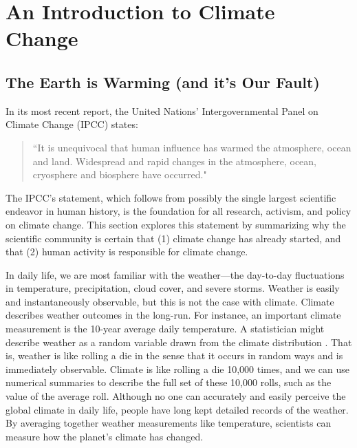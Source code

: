 \newpage
\section{An Introduction to Climate Change}

\subsection{The Earth is Warming (and it's Our Fault)}

In its most recent report, the United Nations' Intergovernmental Panel on Climate Change (IPCC) states:
\begin{quote}
	\singlespacing``It is unequivocal that human influence has warmed the atmosphere, ocean and land. Widespread and rapid changes in the atmosphere, ocean, cryosphere and biosphere have occurred." \citep{ipcc1_summary}
\end{quote}
The IPCC's statement, which follows from possibly the single largest scientific endeavor in human history, is the foundation for all research, activism, and policy on climate change. This section explores this statement by summarizing why the scientific community is certain that (1) climate change has already started, and that (2) human activity is responsible for climate change. 

In daily life, we are most familiar with the weather---the day-to-day fluctuations in temperature, precipitation, cloud cover, and severe storms. Weather is easily and instantaneously observable, but this is not the case with climate. Climate describes weather outcomes in the long-run. For instance, an important climate measurement is the 10-year average daily temperature. A statistician might describe weather as a random variable drawn from the climate distribution \citep{auffhammer2018quantifying}. That is, weather is like rolling a die in the sense that it occurs in random ways and is immediately observable. Climate is like rolling a die 10,000 times, and we can use numerical summaries to describe the full set of these 10,000 rolls, such as the value of the average roll. Although no one can accurately and easily perceive the global climate in daily life, people have long kept detailed records of the weather. By averaging together weather measurements like temperature, scientists can measure how the planet's climate has changed. 

